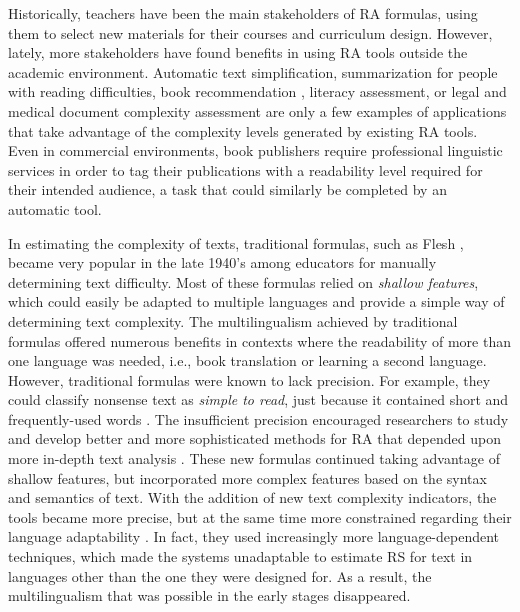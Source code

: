 \documentclass[12pt]{article}
\begin{document}
 Historically, teachers have been the main stakeholders of RA formulas, using them to select new materials for their courses and curriculum design. However, lately, more stakeholders have found benefits in using RA tools outside the academic environment. Automatic text simplification\cite{textsimplification1,textsimplification2}, summarization for people with reading difficulties\cite{textsimplificationWithDisabilities1}, book recommendation \cite{pera2014automating}, literacy assessment\cite{literacy1}, or legal and medical document complexity assessment\cite{medicalReadability1,legalreadability,medicalReadability2,medicalReadability3}  are only a few examples of applications that take advantage of the complexity levels generated by existing RA tools. Even in commercial environments, book publishers require professional linguistic services in order to tag their publications with a readability level required for their intended audience, a task that could similarly be completed by an automatic tool.

In estimating the complexity of texts, traditional formulas, such as Flesh \cite{flesch1948new}, became very popular in the late 1940's among educators for manually determining text difficulty. Most of these formulas relied on \textit{shallow features}, which could easily be adapted to multiple languages and provide a simple way of determining text complexity. The multilingualism achieved by traditional formulas offered numerous benefits in contexts where the readability of more than one language was needed, i.e., book translation or learning a second language. However, traditional formulas were known to lack precision. For example, they could classify nonsense text as \textit{simple to read}, just because it contained short and frequently-used words \cite{davison1982failure}. The insufficient precision encouraged researchers to study and develop better and more sophisticated methods for RA that depended upon more in-depth text analysis \cite{franccois2012ai,aluisio2010readability}. These new formulas continued taking advantage of  shallow  features, but incorporated more complex features based on the syntax and semantics of text. With the addition of new text complexity indicators, the tools became more precise, but at the same time more constrained regarding their language adaptability \cite{benjamin2012reconstructing,feng2010comparison}. In fact, they used increasingly more language-dependent techniques, which made the systems unadaptable to estimate RS for text in languages other than the one they were designed for. As a result, the multilingualism that was possible in the early stages disappeared.  
\end{document}
